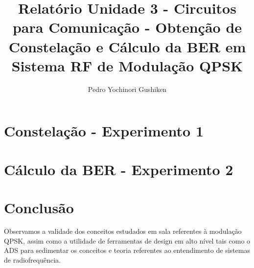 \documentclass[10pt]{report}
\title{Relatório Unidade 3 - Circuitos para Comunicação - Obtenção de Constelação e Cálculo da BER em Sistema RF de Modulação QPSK}
\author{Pedro Yochinori Gushiken}
\begin{document}
\maketitle
\chapter{Constelação - Experimento 1}

\chapter{Cálculo da BER - Experimento 2}

\chapter{Conclusão}
Observamos a validade dos conceitos estudados em sala referentes à modulação QPSK, assim como a utilidade de ferramentas de design em alto nível tais como o ADS para sedimentar os conceitos e teoria referentes ao entendimento de sistemas de radiofrequência. 
\end{document}
